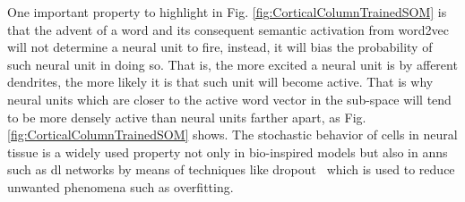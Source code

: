 {One important property to highlight in Fig. \ref{fig:CorticalColumnTrainedSOM} is that the advent of a word and its consequent semantic activation from word2vec will not determine a neural unit to fire, instead, it will bias the probability of such neural unit in doing so. That is, the more excited a neural unit is by afferent dendrites, the more likely it is that such unit will become active. That is why neural units which are closer to the active word vector in the sub-space will tend to be more densely active than neural units farther apart, as Fig. \ref{fig:CorticalColumnTrainedSOM} shows. The stochastic behavior of cells in neural tissue is a widely used property not only in bio-inspired models \cite{harrison_l.m_stochastic_2005} but also in \glspl{ann} such as \gls{dl} networks by means of techniques like dropout~\cite{Srivastava2014DropoutAS} which is used to reduce unwanted phenomena such as overfitting.
}








